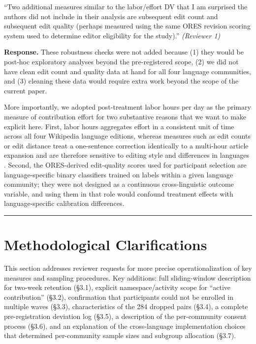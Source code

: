 \documentclass[12pt]{article}
\newenvironment{reviewquote}{%
  \def\FrameCommand{{\color{quotebarcolor}\vrule width 2pt}\colorbox{quotebg}}%
  \MakeFramed{\advance\hsize-\width \FrameRestore}%
  \small
}{%
  \endMakeFramed
}
\newcommand{\sectionnote}[1]{\par\smallskip#1\par\medskip}
\begin{document}
\begin{reviewquote}
``Two additional measures similar to the labor/effort DV that I am surprised the authors did not include in their analysis are subsequent edit count and subsequent edit quality (perhaps measured using the same ORES revision scoring system used to determine editor eligibility for the study).'' \textit{(Reviewer 1)}
\end{reviewquote}

\textbf{Response.} These robustness checks were not added because (1) they would be post-hoc exploratory analyses beyond the pre-registered scope, (2) we did not have clean edit count and quality data at hand for all four language communities, and (3) cleaning these data would require extra work beyond the scope of the current paper.

More importantly, we adopted post-treatment labor hours per day as the primary measure of contribution effort for two substantive reasons that we want to make explicit here. First, labor hours aggregates effort in a consistent unit of time across all four Wikipedia language editions, whereas measures such as edit counts or edit distance treat a one-sentence correction identically to a multi-hour article expansion and are therefore sensitive to editing style and differences in languages \cite{geiger_using_2013}. Second, the ORES-derived edit-quality scores used for participant selection are language-specific binary classifiers trained on labels within a given language community; they were not designed as a continuous cross-linguistic outcome variable, and using them in that role would confound treatment effects with language-specific calibration differences.

\bigskip\hrule\bigskip

\section{Methodological Clarifications}

\sectionnote{This section addresses reviewer requests for more precise operationalization of key measures and sampling procedures. Key additions: full sliding-window description for two-week retention (\S3.1), explicit namespace/activity scope for ``active contribution'' (\S3.2), confirmation that participants could not be enrolled in multiple waves (\S3.3), characteristics of the 284 dropped pairs (\S3.4), a complete pre-registration deviation log (\S3.5), a description of the per-community consent process (\S3.6), and an explanation of the cross-language implementation choices that determined per-community sample sizes and subgroup allocation (\S3.7).}
\end{document}
